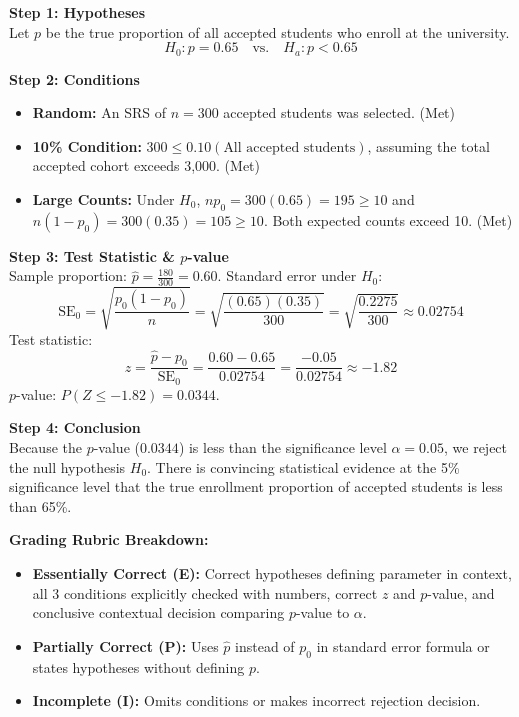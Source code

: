 \begin{frqrubricbox}
\textbf{Step 1: Hypotheses}\\
Let $p$ be the true proportion of all accepted students who enroll at the university.
\[ H_0: p = 0.65 \quad \text{vs.} \quad H_a: p < 0.65 \]

\textbf{Step 2: Conditions}\\
\begin{itemize}
  \item \textbf{Random:} An SRS of $n = 300$ accepted students was selected. (Met)
  \item \textbf{10\% Condition:} $300 \le 0.10(\text{All accepted students})$, assuming the total accepted cohort exceeds 3,000. (Met)
  \item \textbf{Large Counts:} Under $H_0$, $n p_0 = 300(0.65) = 195 \ge 10$ and $n(1 - p_0) = 300(0.35) = 105 \ge 10$. Both expected counts exceed 10. (Met)
\end{itemize}

\textbf{Step 3: Test Statistic \& $p$-value}\\
Sample proportion: $\hat{p} = \frac{180}{300} = 0.60$.
Standard error under $H_0$:
\[ \text{SE}_0 = \sqrt{\frac{p_0(1 - p_0)}{n}} = \sqrt{\frac{(0.65)(0.35)}{300}} = \sqrt{\frac{0.2275}{300}} \approx 0.02754 \]
Test statistic:
\[ z = \frac{\hat{p} - p_0}{\text{SE}_0} = \frac{0.60 - 0.65}{0.02754} = \frac{-0.05}{0.02754} \approx -1.82 \]
$p$-value: $P(Z \le -1.82) = 0.0344$.

\textbf{Step 4: Conclusion}\\
Because the $p$-value ($0.0344$) is less than the significance level $\alpha = 0.05$, we reject the null hypothesis $H_0$. There is convincing statistical evidence at the 5\% significance level that the true enrollment proportion of accepted students is less than 65\%.

\textbf{Grading Rubric Breakdown:}\\
\begin{itemize}
  \item \textbf{Essentially Correct (E):} Correct hypotheses defining parameter in context, all 3 conditions explicitly checked with numbers, correct $z$ and $p$-value, and conclusive contextual decision comparing $p$-value to $\alpha$.
  \item \textbf{Partially Correct (P):} Uses $\hat{p}$ instead of $p_0$ in standard error formula or states hypotheses without defining $p$.
  \item \textbf{Incomplete (I):} Omits conditions or makes incorrect rejection decision.
\end{itemize}
\end{frqrubricbox}

